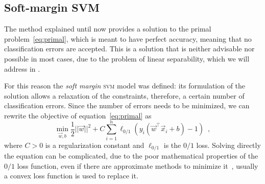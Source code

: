 \subsection{Soft-margin SVM}
\label{sec:se-svm}
The method explained until now provides a solution to the primal problem~\ref{eq:primal}, which is meant to
have perfect accuracy, meaning that no classification errors are accepted. This is a solution that
is neither advisable nor possible in most cases, due to the problem of linear separability, which we
will address in .

For this reason the \emph{soft margin} \textsc{svm} model was defined: its formulation of the solution
allows a relaxation of the constraints, therefore, a certain number of classification errors.
Since the number of errors needs to be minimized, we can rewrite the objective of equation~\ref{eq:primal} as
\begin{equation}
	\label{eq:sm-primal}
	\min_{\vec{w}, b} \frac{1}{2}||\vec{w}||^2 + C\sum_{i = 1}^n \ell_{0 / 1}(y_i (\vec{w}^\top
	\vec{x}_i + b) - 1) \enspace,
\end{equation}
where $C > 0$ is a regularization constant and $\ell_{0 / 1}$ is the $0/1$ loss. Solving directly the equation can be complicated, due to the poor mathematical properties of the $0/1$ loss function, even if there are approximate methods to minimize it~\cite{nguyen2013}, usually a convex loss function is used to replace it.

